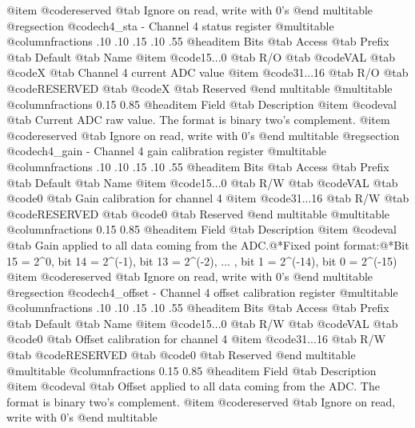 @item @code{reserved} @tab Ignore on read, write with 0's
@end multitable
@regsection @code{ch4_sta} - Channel 4 status register
@multitable @columnfractions .10 .10 .15 .10 .55
@headitem Bits @tab Access @tab Prefix @tab Default @tab Name
@item @code{15...0}
@tab R/O @tab
@code{VAL}
@tab @code{X} @tab 
Channel 4 current ADC value
@item @code{31...16}
@tab R/O @tab
@code{RESERVED}
@tab @code{X} @tab 
Reserved
@end multitable
@multitable @columnfractions 0.15 0.85
@headitem Field @tab Description
@item @code{val} @tab Current ADC raw value. The format is binary two's complement.
@item @code{reserved} @tab Ignore on read, write with 0's
@end multitable
@regsection @code{ch4_gain} - Channel 4 gain calibration register
@multitable @columnfractions .10 .10 .15 .10 .55
@headitem Bits @tab Access @tab Prefix @tab Default @tab Name
@item @code{15...0}
@tab R/W @tab
@code{VAL}
@tab @code{0} @tab 
Gain calibration for channel 4
@item @code{31...16}
@tab R/W @tab
@code{RESERVED}
@tab @code{0} @tab 
Reserved
@end multitable
@multitable @columnfractions 0.15 0.85
@headitem Field @tab Description
@item @code{val} @tab Gain applied to all data coming from the ADC.@*Fixed point format:@*Bit 15 = 2^0, bit 14 = 2^(-1), bit 13 = 2^(-2), ... , bit 1 = 2^(-14), bit 0 = 2^(-15)
@item @code{reserved} @tab Ignore on read, write with 0's
@end multitable
@regsection @code{ch4_offset} - Channel 4 offset calibration register
@multitable @columnfractions .10 .10 .15 .10 .55
@headitem Bits @tab Access @tab Prefix @tab Default @tab Name
@item @code{15...0}
@tab R/W @tab
@code{VAL}
@tab @code{0} @tab 
Offset calibration for channel 4
@item @code{31...16}
@tab R/W @tab
@code{RESERVED}
@tab @code{0} @tab 
Reserved
@end multitable
@multitable @columnfractions 0.15 0.85
@headitem Field @tab Description
@item @code{val} @tab Offset applied to all data coming from the ADC. The format is binary two's complement.
@item @code{reserved} @tab Ignore on read, write with 0's
@end multitable
